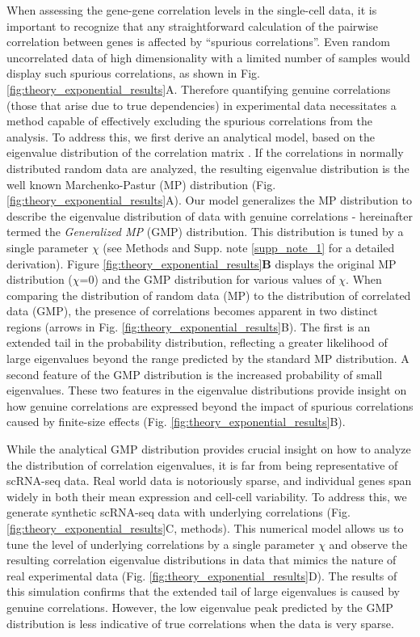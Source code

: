\documentclass[12pt]{article}
\begin{document}
When assessing the gene-gene correlation levels in the single-cell data, it is important to recognize that any straightforward calculation of the pairwise correlation between genes is affected by ``spurious correlations''. Even random uncorrelated data of high dimensionality with a limited number of samples would display such spurious correlations, as shown in Fig. \ref{fig:theory_exponential_results}A. Therefore quantifying genuine correlations (those that arise due to true dependencies) in experimental data necessitates a method capable of effectively excluding the spurious correlations from the analysis. To address this, we first derive an analytical model, based on the eigenvalue distribution of the correlation matrix \cite{bouchaud2009,BUN20171}. If the correlations in normally distributed random data are analyzed, the resulting eigenvalue distribution is the well known Marchenko-Pastur (MP) distribution \cite{Marchenko_Pastur} (Fig. \ref{fig:theory_exponential_results}A). Our model generalizes the MP distribution to describe the eigenvalue distribution of data with genuine correlations - hereinafter termed the \textit{Generalized MP} (GMP) distribution. This distribution is tuned by a single parameter $\chi$ (see Methods and Supp. note \ref{supp_note_1} for a detailed derivation). Figure \ref{fig:theory_exponential_results}\textbf{B} displays the original MP distribution ($\chi$=0) and the GMP distribution for various values of $\chi$. When comparing the distribution of random data (MP) to the distribution of correlated data (GMP), the presence of correlations becomes apparent in two distinct regions (arrows in Fig. \ref{fig:theory_exponential_results}B). The first is an extended tail in the probability distribution, reflecting a greater likelihood of large eigenvalues beyond the range predicted by the standard MP distribution. A second feature of the GMP distribution is the increased probability of small eigenvalues. These two features in the eigenvalue distributions provide insight on how genuine correlations are expressed beyond the impact of spurious correlations caused by finite-size effects (Fig. \ref{fig:theory_exponential_results}B). \par
While the analytical GMP distribution provides crucial insight on how to analyze the distribution of correlation eigenvalues, it is far from being representative of scRNA-seq data. Real world data is notoriously sparse, and individual genes span widely in both their mean expression and cell-cell variability. To address this, we generate synthetic scRNA-seq data with underlying correlations (Fig. \ref{fig:theory_exponential_results}C, methods). This numerical model allows us to tune the level of underlying correlations by a single parameter $\chi$ and observe the resulting correlation eigenvalue distributions in data that mimics the nature of real experimental data (Fig. \ref{fig:theory_exponential_results}D). The results of this simulation confirms that the extended tail of large eigenvalues is caused by genuine correlations. However, the low eigenvalue peak predicted by the GMP distribution is less indicative of true correlations when the data is very sparse.\par
\end{document}
